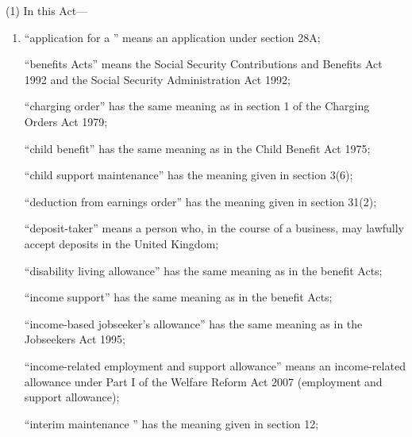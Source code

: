 \documentclass[a4paper]{article}
\begin{document}
(1) In this Act---
\begin{enumerate}\item[]

“application for a ” means an application under section 28A;


“benefits Acts” means the Social Security Contributions and Benefits Act
1992 and the Social Security Administration Act 1992;

“charging order” has the same meaning as in section 1 of the Charging Orders Act 1979;

“child benefit” has the same meaning as in the Child Benefit Act 1975;

“child support maintenance” has the meaning given in section 3(6);


“deduction from earnings order” has the meaning given in section 31(2);



“deposit-taker” means a person who, in the course of a business, may lawfully accept deposits in the United Kingdom;

“disability living allowance” has the same meaning as in the benefit Acts;


“income support” has the same meaning as in the benefit Acts;

“income-based jobseeker’s allowance” has the same meaning as in the
Jobseekers Act 1995;

“income-related employment and support allowance” means an income-related
allowance under Part I of the Welfare Reform Act 2007 (employment and support
allowance);

“interim maintenance ” has the meaning given in section
12;


\end{enumerate}
\end{document}
